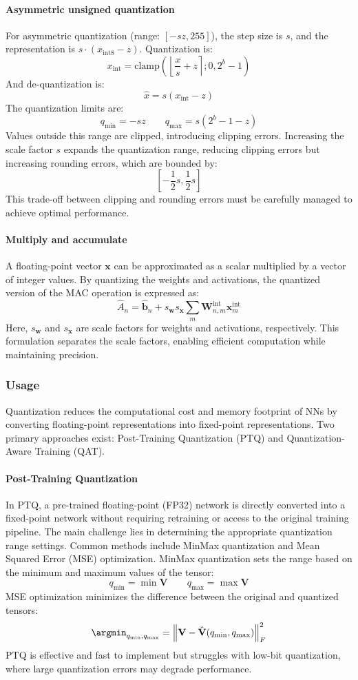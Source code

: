 \paragraph*{Asymmetric unsigned quantization}
For asymmetric quantization (range: $[-sz,255]$), the step size is $s$, and the representation is $s\cdot (x_{\text{int8}}-z)$. 
Quantization is:
\[x_{\text{int}}=\text{clamp}\left(\left\lfloor \dfrac{x}{s}+z\right\rceil;0,2^b-1 \right)\]
\noindent And de-quantization is:
\[\hat{x}=s(x_{\text{int}}-z)\]
\noindent The quantization limits are:
\[q_{\min}=-sz\qquad q_{\max}=s(2^b-1-z)\]
Values outside this range are clipped, introducing clipping errors. 
Increasing the scale factor $s$ expands the quantization range, reducing clipping errors but increasing rounding errors, which are bounded by:
\[\left[-\dfrac{1}{2}s,\dfrac{1}{2}s\right]\]
\noindent This trade-off between clipping and rounding errors must be carefully managed to achieve optimal performance.

\paragraph*{Multiply and accumulate}
A floating-point vector $\mathbf{x}$ can be approximated as a scalar multiplied by a vector of integer values.
By quantizing the weights and activations, the quantized version of the MAC operation is expressed as:
\[\hat{A}_n=\hat{\textbf{b}}_n+s_{\textbf{w}}s_{\textbf{x}}\sum_m\textbf{W}_{n,m}^{\text{int}}\textbf{x}_m^{\text{int}}\]
Here, $s_{\textbf{w}}$ and $s_{\textbf{x}}$ are scale factors for weights and activations, respectively. 
This formulation separates the scale factors, enabling efficient computation while maintaining precision.

\subsubsection{Usage}
Quantization reduces the computational cost and memory footprint of NNs by converting floating-point representations into fixed-point representations. 
Two primary approaches exist: Post-Training Quantization (PTQ) and Quantization-Aware Training (QAT).

\paragraph*{Post-Training Quantization}
In PTQ, a pre-trained floating-point (FP32) network is directly converted into a fixed-point network without requiring retraining or access to the original training pipeline. 
The main challenge lies in determining the appropriate quantization range settings. 
Common methods include MinMax quantization and Mean Squared Error (MSE) optimization.
MinMax quantization sets the range based on the minimum and maximum values of the tensor:
\[q_{\min}=\min\mathbf{V} \qquad q_{\max}=\max\mathbf{V}\]
MSE optimization minimizes the difference between the original and quantized tensors:
\[\argmin_{q_{\min},q_{\max}}={\left\lVert \mathbf{V}-\hat{\mathbf{V}}(q_{\min},q_{\max})\right\rVert}_F^2 \]
PTQ is effective and fast to implement but struggles with low-bit quantization, where large quantization errors may degrade performance.

